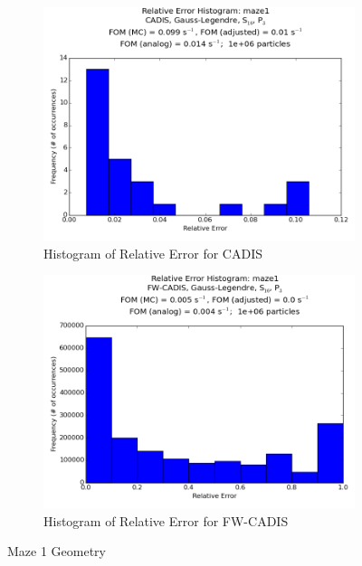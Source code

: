 \documentclass[10pt]{article}
\begin{document}
\begin{figure}[!ht]
\centering
\begin{subfigure}{0.49\textwidth}
\centering
\includegraphics[width = \textwidth]{hist-cad-maze1-GL16.png}
\caption{Histogram of Relative Error for CADIS}
\label{maze1-cad}
\end{subfigure}
\hfill
\begin{subfigure}{0.49\textwidth}
\centering
\includegraphics[width = \textwidth]{hist-fwc-maze1-GL16.png}
\caption{Histogram of Relative Error for FW-CADIS}
\label{maze1-fwc}
\end{subfigure}
\caption{Maze 1 Geometry}
\label{maze1}
\end{figure}
\end{document}
